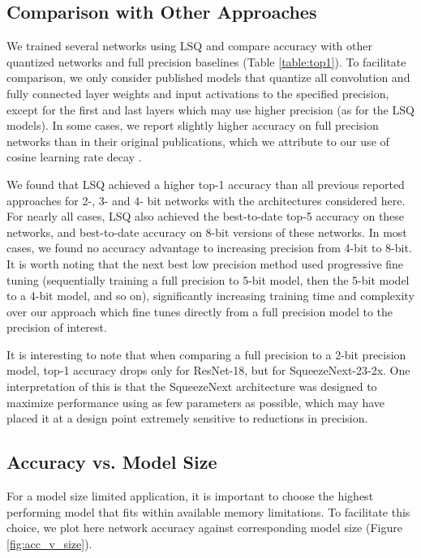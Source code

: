 \documentclass{article}
\begin{document}
\subsection{Comparison with Other Approaches}

We trained several networks using LSQ and compare accuracy with other quantized networks and full precision baselines (Table \ref{table:top1}).
To facilitate comparison, we only consider published models that quantize all convolution and fully connected layer weights and input activations to the specified precision, except for the first and last layers which may use higher precision (as for the LSQ models).
In some cases, we report slightly higher accuracy on full precision networks than in their original publications, which we attribute to our use of cosine learning rate decay \citep{DBLP:journals/corr/LoshchilovH16a}.


We found that LSQ achieved a higher top-1 accuracy than all previous reported approaches for 2-, 3- and 4- bit networks with the architectures considered here.
For nearly all cases, LSQ also achieved the best-to-date top-5 accuracy on these networks, and best-to-date accuracy on 8-bit versions of these networks.
In most cases, we found no accuracy advantage to increasing precision from 4-bit to 8-bit.
It is worth noting that the next best low precision method \citep{jung2018joint} used progressive fine tuning (sequentially training a full precision to 5-bit model, then the 5-bit model to a 4-bit model, and so on), significantly increasing training time and complexity over our approach which fine tunes directly from a full precision model to the precision of interest.


It is interesting to note that when comparing a full precision to a 2-bit precision model, top-1 accuracy drops only  for ResNet-18, but  for SqueezeNext-23-2x.
One interpretation of this is that the SqueezeNext architecture was designed to maximize performance using as few parameters as possible, which may have placed it at a design point extremely sensitive to reductions in precision.



\subsection{Accuracy vs. Model Size}

For a model size limited application, it is important to choose the highest performing model that fits within available memory limitations.  To facilitate this choice, we plot here network accuracy against corresponding model size (Figure \ref{fig:acc_v_size}).
\end{document}
